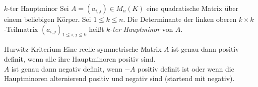 \documentclass[main.tex]{subfiles}
\begin{document}
\begin{karte}{\(k\)-ter Hauptminor}
    Sei \(A = (a_{i,j}) \in M_n(K)\) eine 
    quadratische Matrix über einem beliebigen Körper. 
    Sei \( 1 \leq k\leq n \). Die Determinante der 
    linken oberen \( k\times k \)-Teilmatrix 
    \( (a_{i,j})_{1\leq i,j \leq k} \) heißt 
    \textit{\(k\)-ter Hauptminor} von \(A\).
\end{karte}

\begin{karte}{Hurwitz-Kriterium}
    Eine reelle symmetrische Matrix \(A\) ist genau dann 
    positiv definit, wenn alle ihre Hauptminoren 
    positiv sind.\\
    \(A\) ist genau dann negativ definit, wenn 
    \(-A\) positiv definit ist oder 
    wenn die Hauptminoren alternierend positiv und 
    negativ sind (startend mit negativ).
\end{karte}
\end{document}

